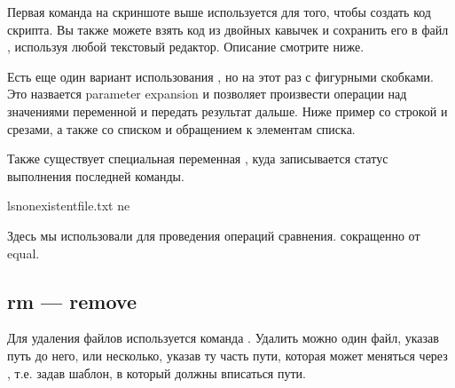 \documentclass[letterpaper,10pt,russian]{sphinxmanual}
\begin{document}
\sphinxAtStartPar
{}

\sphinxAtStartPar
Первая команда на скриншоте выше используется для того, чтобы создать код скрипта. Вы также можете взять код из двойных кавычек  и сохранить его в файл , используя любой текстовый редактор. Описание  смотрите ниже.

\sphinxAtStartPar
Есть еще один вариант использования \sphinxcode{\sphinxupquote{\$}}, но на этот раз с фигурными скобками. Это назвается parameter expansion и позволяет произвести операции над значениями переменной и передать результат дальше. Ниже пример со строкой  и срезами, а также со списком  и обращением к элементам списка.

\sphinxAtStartPar
{}

\sphinxAtStartPar
Также существует специальная переменная , куда записывается статус выполнения последней команды.

\begin{sphinxVerbatim}[commandchars=\\\{\}]
lsnon\PYGZus{}existent\PYGZus{}file.txt
\PYGZhy{}ne
\end{sphinxVerbatim}

\sphinxAtStartPar
{}

\sphinxAtStartPar
Здесь мы использовали  для проведения операций сравнения.  сокращенно от equal.


\subsection{rm — remove}
\label{\detokenize{educational_materials/bash/content:rm-remove}}
\sphinxAtStartPar
Для удаления файлов используется команда . Удалить можно один файл, указав путь до него, или несколько, указав ту часть пути, которая может меняться через \sphinxcode{\sphinxupquote{*}}, т.е. задав шаблон, в который должны вписаться пути.
\end{document}
